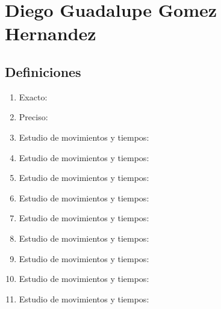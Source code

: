 \section{Diego Guadalupe Gomez Hernandez}
\subsection{Definiciones}

\begin{enumerate}
    \item Exacto: 
    \item Preciso:
    \item Estudio de movimientos y tiempos:
    \item Estudio de movimientos y tiempos:
    \item Estudio de movimientos y tiempos:
    \item Estudio de movimientos y tiempos:
    \item Estudio de movimientos y tiempos:
    \item Estudio de movimientos y tiempos:
    \item Estudio de movimientos y tiempos:
    \item Estudio de movimientos y tiempos:
    \item Estudio de movimientos y tiempos:
\end{enumerate}
